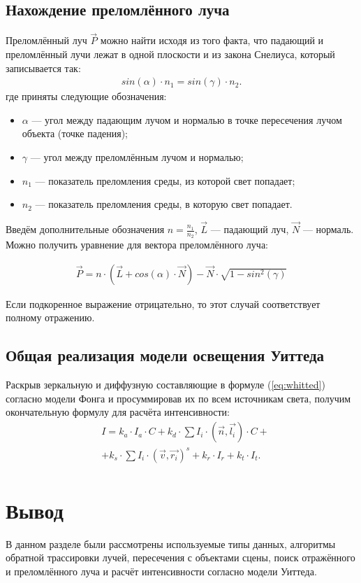 \subsection{Нахождение преломлённого луча}

Преломлённый луч $\vec{P}$ можно найти исходя из того факта, что падающий и преломлённый лучи лежат в одной плоскости и из закона Снелиуса, который записывается так:
\begin{equation} \label{eq:ab}
	\begin{aligned}
		sin(\alpha)\cdot n_{1} = sin(\gamma)\cdot n_{2}.
	\end{aligned}
\end{equation}
где приняты следующие обозначения:
\begin{itemize}[label=---]
	\item $\alpha$ --- угол между падающим лучом и нормалью в точке пересечения лучом объекта (точке падения);
	\item $\gamma$ --- угол между преломлённым лучом и нормалью;
	\item $n_{1}$ --- показатель преломления среды, из которой свет попадает;
	\item $n_{2}$ --- показатель преломления среды, в которую свет попадает.
\end{itemize}

Введём дополнительные обозначения $n = \frac{n_{1}}{n_{2}}$, $\vec{L}$ --- падающий луч, $\vec{N}$ --- нормаль. Можно получить уравнение для вектора преломлённого луча:

\begin{equation} \label{eq:ab}
	\begin{aligned}
		\vec{P} = n \cdot (\vec{L} + cos(\alpha) \cdot \vec{N}) - \vec{N} \cdot \sqrt{1 - sin^2(\gamma)}
	\end{aligned}
\end{equation}

Если подкоренное выражение отрицательно, то этот случай соответствует полному отражению.

\subsection{Общая реализация модели освещения Уиттеда}

Раскрыв зеркальную и диффузную составляющие в формуле (\ref{eq:whitted}) согласно модели Фонга и просуммировав их по всем источникам света, получим окончательную формулу для расчёта интенсивности:
\begin{equation} \label{eq:ab}
	\begin{aligned}
		& I = k_{a}\cdot I_{a}\cdot C + k_{d} \cdot  \sum I_{i}\cdot (\vec{n}, \vec{l_{i}}) \cdot  C + \\
		& + k_{s} \cdot  \sum I_{i}\cdot (\vec{v}, \vec{r_{i}})^s + k_{r}\cdot I_{r} + k_{t}\cdot I_{t}. \\
	\end{aligned}
\end{equation}

\section*{Вывод}
В данном разделе были рассмотрены используемые типы данных, алгоритмы обратной трассировки лучей, пересечения с объектами сцены, поиск отражённого и преломлённого луча и расчёт интенсивности согласно модели Уиттеда.
